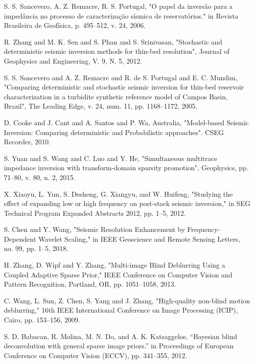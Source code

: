 \documentclass[journal]{IEEEtran}
\begin{document}
\begin{thebibliography}{1}
S. S. Sancevero, A. Z. Remacre, R. S. Portugal, "O papel da inversão para a impedância no processo de caracterização sísmica de reservatórios." in Revista Brasileira de Geofísica, p. 495--512, v. 24, 2006.

R. Zhang and M. K. Sen and S. Phan and S. Srinivasan, "Stochastic and deterministic seismic inversion methods for thin-bed resolution", Journal of Geophysics and Engineering, V. 9, N. 5, 2012.

S. S. Sancevero and A. Z. Remacre and R. de S. Portugal and E. C. Mundim, "Comparing deterministic and stochastic seismic inversion for thin-bed reservoir characterization in a turbidite synthetic reference model of Campos Basin, Brazil", The Leading Edge, v. 24, num. 11, pp. 1168--1172, 2005. 

D. Cooke and J. Cant and A. Santos and  P. Wa, Australia,  "Model-based Seismic Inversion: Comparing deterministic and Probabilistic approaches". CSEG Recorder, 2010. 

S. Yuan and S. Wang and C. Luo and Y. He, "Simultaneous multitrace impedance inversion with transform-domain sparsity promotion", Geophysics, pp. 71--80, v. 80, n. 2, 2015.

X. Xiaoyu, L. Yun, S. Desheng, G. Xiangyu, and W. Huifeng, "Studying the effect of expanding low or high frequency on post-stack seismic inversion," in SEG Technical Program Expanded Abstracts 2012, pp. 1--5, 2012.

S. Chen and Y. Wang, "Seismic Resolution Enhancement by Frequency-Dependent Wavelet Scaling," in IEEE Geoscience and Remote Sensing Letters, no. 99, pp. 1--5, 2018.

H. Zhang, D. Wipf and Y. Zhang, "Multi-image Blind Deblurring Using a Coupled Adaptive Sparse Prior," IEEE Conference on Computer Vision and Pattern Recognition, Portland, OR, pp. 1051--1058, 2013.

C. Wang, L. Sun, Z. Chen, S. Yang and J. Zhang, "High-quality non-blind motion deblurring," 16th IEEE International Conference on Image Processing (ICIP), Cairo, pp. 153--156, 2009.

S. D. Babacan, R. Molina, M. N. Do, and A. K. Katsaggelos, ``Bayesian blind deconvolution with general sparse image priors.'' in Proceedings of European Conference on Computer Vision (ECCV), pp. 341--355, 2012.


\end{thebibliography}
\end{document}
